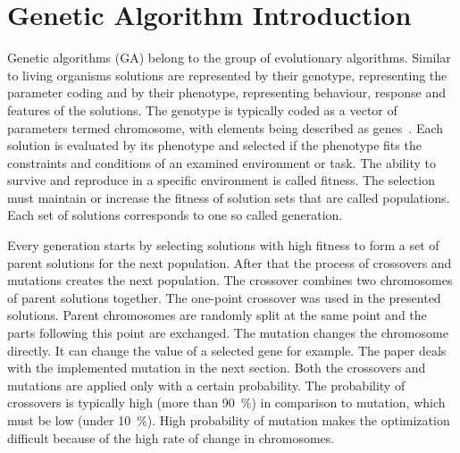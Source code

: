 \section{Genetic Algorithm Introduction}

Genetic algorithms (GA) belong to the group of evolutionary algorithms. Similar to living organisms solutions are represented by their genotype, representing the parameter coding and by their phenotype, representing behaviour, response and features of the solutions. The genotype is typically coded as a vector of parameters termed chromosome, with elements being described as genes~\cite{Fogel2006}. Each solution is evaluated by its phenotype and selected if the phenotype fits the constraints and conditions of an examined environment or task. The ability to survive and reproduce in a specific environment is called fitness. The selection must maintain or increase the fitness of solution sets that are called populations. Each set of solutions corresponds to one so called generation.

Every generation starts by selecting solutions with high fitness to form a set of parent solutions for the next population. After that the process of crossovers and mutations creates the next population. The crossover combines two chromosomes of parent solutions together. The one-point crossover was used in the presented solutions. Parent chromosomes are randomly split at the same point and the parts following this point are exchanged. The mutation changes the chromosome directly. It can change the value of a selected gene for example. The paper deals with the implemented mutation in the next section. Both the crossovers and mutations are applied only with a certain probability. The probability of crossovers is typically high (more than 90~\%) in comparison to mutation, which must be low (under 10~\%). High probability of mutation makes the optimization difficult because of the high rate of change in chromosomes.

